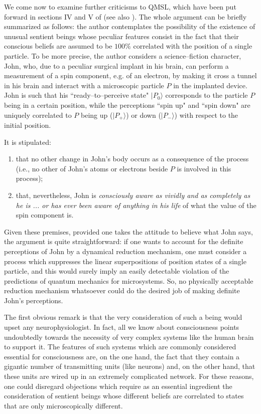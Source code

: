 \documentclass[10pt,a4paper]{article}
\begin{document}
We come now to examine further criticisms to QMSL, which have been
put forward in sections IV and V of \cite{ap} (see also
\cite{al5}). The whole argument can be briefly summarized as
follows: the author contemplates the possibility of the existence
of unusual sentient beings whose peculiar features consist in the
fact that their conscious beliefs are assumed to be $100\%$
correlated with the position of a single particle. To be more
precise, the author considers a science--fiction character, John,
who, due to a peculiar surgical implant in his brain, can perform
a measurement of a spin component, e.g. of an electron, by making
it cross a tunnel in his brain and interact with a microscopic
particle $P$ in the implanted device. John is such that his
``ready--to--perceive state" $|P_{0}\rangle$ corresponds to the
particle $P$ being in a certain position, while the perceptions
``spin up" and ``spin down" are uniquely correlated to $P$ being
up ($|P_{+}\rangle$) or down ($|P_{-}\rangle$) with respect to the
initial position.

It is stipulated:
\begin{enumerate}
\item that no other change in John's body occurs as a consequence
of the process (i.e., no other of John's atoms or electrons beside
$P$ is involved in this process);
\item that, nevertheless, John is {\it consciously aware as vividly
and as completely as he is ... or has ever been aware of anything
in his life} of what the value of the spin component is.
\end{enumerate}

Given these premises, provided one takes the attitude to believe
what John says, the argument is quite straightforward: if one
wants to account for the definite perceptions of John by a
dynamical reduction mechanism, one must consider a process which
suppresses the linear superpositions of position states of a
single particle, and this would surely imply an easily detectable
violation of the predictions of quantum mechanics for
microsystems. So, no physically acceptable reduction mechanism
whatsoever could do the desired job of making definite John's
perceptions.

The first obvious remark is that the very consideration of such a
being would upset any neurophysiologist. In fact, all we know
about consciousness points undoubtedly towards the necessity of
very complex systems like the human brain to support it. The
features of such systems which are commonly considered essential
for consciousness are, on the one hand, the fact that they contain
a gigantic number of transmitting units (like neurons) and, on the
other hand, that these units are wired up in an extremely
complicated network. For these reasons, one could disregard
objections which require as an essential ingredient the
consideration of sentient beings whose different beliefs are
correlated to states that are only microscopically different.
\end{document}
